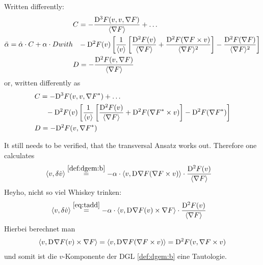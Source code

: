 Written differently:
\begin{subequations}
    \begin{align}
        \ddot{ \alpha }   =   \dot{ \alpha } \mult C  +  \alpha \mult D
    \end{align}
    with
    \begin{align}
        &\begin{aligned}
            C   &=
            - \frac{ \diff{3}{F}( v, v, \grad{F} ) }{ \skaq{\grad{F}} }  +  \dots \\
            &- \diff{2}{F}( v )
            \left[ \frac{ 1 }{ \skaq{v} }
            \left[ \frac{ \diff{2}{F}( v ) }{ \skaq{\grad{F}} }  +
            \frac{ \diff{2}{F}( \grad{F} \times v ) }{ \skaq{\grad{F}}^2 } \right]  -
            \frac{ \diff{2}{F}( \grad{F} ) }{ \skaq{\grad{F}}^2 } \right]
        \end{aligned}\\
        &D   =   - \frac{ \diff{2}{F}( v, \grad{F} ) }{ \skaq{\grad{F}} }
    \end{align}
\end{subequations}
or, written differently as
\begin{subequations}
    \begin{align}
        &\begin{aligned}
            C   &=
            - \mathrm{D}^{ 3 }F( v, v, {\nabla F}^* )  +  \dots \\
            &\hphantom{=}-\mathrm{D}^{ 2 }F( v )
            \left[ \frac{ 1 }{ \langle v \rangle }
            \left[ \frac{ \mathrm{D}^{ 2 }F( v ) }{ \langle \nabla F \rangle }  +
            \mathrm{D}^{ 2 }F( {\nabla F}^* \times v ) \right]  -
            \mathrm{D}^{ 2 }F( {\nabla F}^* ) \right]
        \end{aligned}\\
        &D   =   - \mathrm{D}^{ 2 }F( v, {\nabla F}^* )
    \end{align}
\end{subequations}



It still needs to be verified, that the transversal Ansatz works out.
Therefore one calculates
\begin{align}
    \langle  v ,  \delta \dot{ v }  \rangle  &\overset{\eqref{def:dgem:b}}{=}
    -\alpha \cdot \langle  v ,  \mathrm{D}^{  }\nabla F( \nabla F \times v )  \rangle  \cdot
    \frac{ \mathrm{D}^{ 2 }F( v ) }{ \langle  \nabla F  \rangle }
\end{align}
Heyho, nicht so viel Whiskey trinken:
\begin{align}
    \langle  v ,  \delta \dot{ v }  \rangle  &\overset{\eqref{eq:tadd}}{=}
    -\alpha \cdot \langle  v ,  \mathrm{D}^{  }\nabla F( v ) \times \nabla F  \rangle  \cdot
    \frac{ \mathrm{D}^{ 2 }F( v ) }{ \langle  \nabla F   \rangle }
\end{align}
Hierbei berechnet man
\begin{align}
    \langle  v ,  \mathrm{D}^{  }\nabla F( v ) \times \nabla F  \rangle  =
    \langle  v ,  \mathrm{D}^{  }\nabla F( \nabla F \times v )  \rangle  =
    \mathrm{D}^{ 2 }F( v, \nabla F \times v )
\end{align}
und somit ist die $ v $-Komponente der DGL \eqref{def:dgem:b} eine Tautologie.



